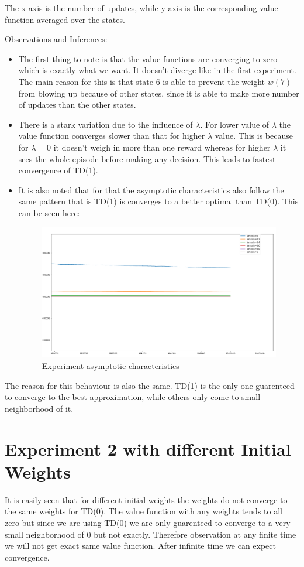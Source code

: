 \documentclass{article}
\begin{document}
The x-axis is the number of updates, while y-axis is the corresponding value function averaged over the states.

Observations and Inferences:
\begin{itemize}
\item The first thing to note is that the value functions are converging to zero which is exactly what we want. It doesn't diverge like in the first experiment. The main reason for this is that state 6 is able to prevent the weight $w(7)$ from blowing up because of other states, since it is able to make more number of updates than the other states.
\item There is a stark variation due to the influence of $\lambda$. For lower value of $\lambda$ the value function converges slower than that for higher $\lambda$ value. This is because for $\lambda = 0$ it doesn't weigh in more than one reward whereas for higher $\lambda$ it sees the whole episode before making any decision. This leads to fastest convergence of TD(1).
\item It is also noted that for that the asymptotic characteristics also follow the same pattern that is TD(1) is converges to a better optimal than TD(0). This can be seen here:
  \begin{figure}[H]
    \centering
    \includegraphics[scale=0.25]{images/exp22}
    \caption{Experiment asymptotic characteristics}
    \label{fig:ex22}
  \end{figure}
\end{itemize}
The reason for this behaviour is also the same. TD(1) is the only one guarenteed to converge to the best approximation, while others only come to small neighborhood of it.

\section{Experiment 2 with different Initial Weights}
It is easily seen that for different initial weights the weights do not converge to the same weights for TD(0). The value function with any weights tends to all zero but since we are using TD(0) we are only guarenteed to converge to a very small neighborhood of 0 but not exactly. Therefore observation at any finite time we will not get exact same value function. After infinite time we can expect convergence.
\end{document}

